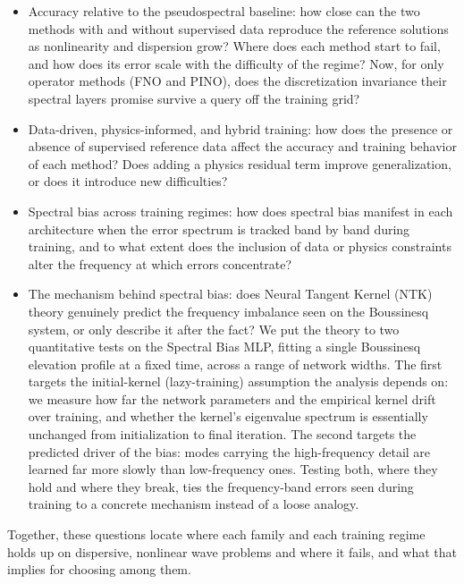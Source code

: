 \begin{itemize}
    \item Accuracy relative to the pseudospectral baseline: 
    how close can the two methods with and without supervised data reproduce the reference solutions as nonlinearity and dispersion grow? Where does each method start to fail, and how does its error scale with the difficulty of the regime? Now, for only operator methods (FNO and PINO), does the discretization invariance their spectral layers promise survive a query off the training grid?

    \item Data-driven, physics-informed, and hybrid training: how does the presence or absence of supervised reference data affect the accuracy and training behavior of each method? Does adding a physics residual term improve generalization, or does it introduce new difficulties?

    \item Spectral bias across training regimes: how does spectral bias manifest in each architecture when the error spectrum is tracked band by band during training, and to what extent does the inclusion of data or physics constraints alter the frequency at which errors concentrate?

    \item The mechanism behind spectral bias: does Neural Tangent Kernel (NTK) theory genuinely predict the frequency imbalance seen on the Boussinesq system, or only describe it after the fact? We put the theory to two quantitative tests on the Spectral Bias MLP, fitting a single Boussinesq elevation profile at a fixed time, across a range of network widths. The first targets the initial-kernel (lazy-training) assumption the analysis depends on: we measure how far the network parameters and the empirical kernel drift over training, and whether the kernel's eigenvalue spectrum is essentially unchanged from initialization to final iteration. The second targets the predicted driver of the bias: modes carrying the high-frequency detail are learned far more slowly than low-frequency ones. Testing both, where they hold and where they break, ties the frequency-band errors seen during training to a concrete mechanism instead of a loose analogy.
\end{itemize}

Together, these questions locate where each family and each training regime holds up on dispersive, nonlinear wave problems and where it fails, and what that implies for choosing among them.

